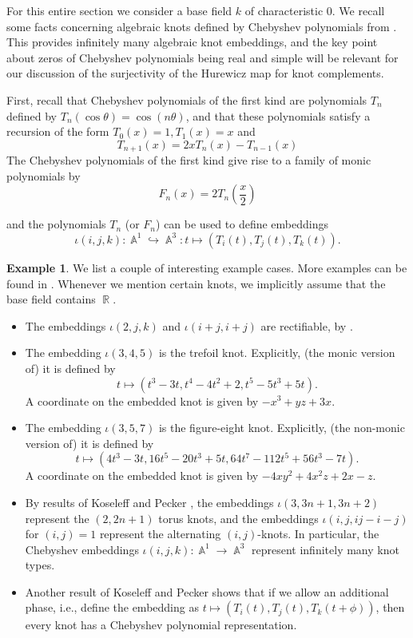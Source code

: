 \documentclass[english]{amsart}
\theoremstyle{definition}
\newtheorem{ex}[prop]{Example}
\DeclareMathOperator{\R}{\mathbb{R}}
\DeclareMathOperator{\A}{\mathbb{A}}
\begin{document}
For this entire section we consider a base field $k$ of characteristic $0$. We recall some facts concerning algebraic knots defined by Chebyshev polynomials from \cite{freudenburg:freudenburg}. This provides infinitely many algebraic knot embeddings, and the key point about zeros of Chebyshev polynomials being real and simple will be relevant for our discussion of the surjectivity of the Hurewicz map for knot complements. 

First, recall that Chebyshev polynomials of the first kind are polynomials $T_n$ defined by $T_n(\cos\theta)=\cos(n\theta)$, and that these polynomials satisfy a recursion of the form $T_0(x)=1, T_1(x)=x$ and 
\[
T_{n+1}(x)=2xT_n(x)-T_{n-1}(x)
\]
The Chebyshev polynomials of the first kind give rise to a family of monic polynomials by
\[
F_n(x)=2T_n\left(\frac{x}{2}\right)
\]

and the polynomials $T_n$ (or $F_n$) can be used to define embeddings 
\[
\iota(i,j,k)\colon\A^1\hookrightarrow\A^3\colon t\mapsto (T_i(t),T_j(t),T_k(t)).
\]

\begin{ex}
We list a couple of interesting example cases. More examples can be found in \cite[Table 2]{freudenburg:freudenburg}. Whenever we mention certain knots, we implicitly assume that the base field contains $\R$.
\begin{itemize}
    \item The embeddings $\iota(2,j,k)$ and $\iota(i+j,i+j)$ are rectifiable, by \cite[Corollaries 4.1 and 4.2]{freudenburg:freudenburg}.
    \item The embedding $\iota(3,4,5)$ is the trefoil knot. Explicitly, (the monic version of) it is defined by 
    \[
    t\mapsto (t^3-3t,t^4-4t^2+2,t^5-5t^3+5t).
    \]
    A coordinate on the embedded knot is given by $-x^3+yz+3x$.
    \item The embedding $\iota(3,5,7)$ is the figure-eight knot. Explicitly, (the non-monic version of) it is defined by 
    \[
    t\mapsto (4t^3-3t,16t^5-20t^3+5t,64t^7-112t^5+56t^3-7t). 
    \]
    A coordinate on the embedded knot is given by $-4xy^2+4x^2z+2x-z$.
    \item By results of Koseleff and Pecker \cite{koseleff:pecker}, the embeddings $\iota(3,3n+1,3n+2)$ represent the $(2,2n+1)$ torus knots, and the embeddings $\iota(i,j,ij-i-j)$ for $(i,j)=1$ represent the alternating $(i,j)$-knots. In particular, the Chebyshev embeddings $\iota(i,j,k)\colon\A^1\to\A^3$ represent infinitely many knot types.
    \item Another result of Koseleff and Pecker \cite{koseleff:pecker} shows that if we allow an additional phase, i.e., define the embedding as $t\mapsto (T_i(t),T_j(t),T_k(t+\phi))$, then every knot has a Chebyshev polynomial representation.
\end{itemize} 
\end{ex}
\end{document}
